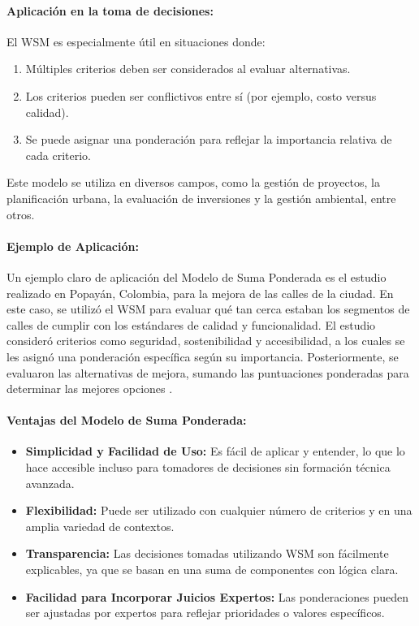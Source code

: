 \documentclass[12pt]{article}
\begin{document}
\paragraph{Aplicación en la toma de decisiones:}
El WSM es especialmente útil en situaciones donde:
\begin{enumerate}
	\item Múltiples criterios deben ser considerados al evaluar alternativas.
	\item Los criterios pueden ser conflictivos entre sí (por ejemplo, costo versus calidad).
	\item Se puede asignar una ponderación para reflejar la importancia relativa de cada criterio.
\end{enumerate}

Este modelo se utiliza en diversos campos, como la gestión de proyectos, la planificación urbana, la evaluación de inversiones y la gestión ambiental, entre otros.

\paragraph{Ejemplo de Aplicación:}
Un ejemplo claro de aplicación del Modelo de Suma Ponderada es el estudio realizado en Popayán, Colombia, para la mejora de las calles de la ciudad. En este caso, se utilizó el WSM para evaluar qué tan cerca estaban los segmentos de calles de cumplir con los estándares de calidad y funcionalidad. El estudio consideró criterios como seguridad, sostenibilidad y accesibilidad, a los cuales se les asignó una ponderación específica según su importancia. Posteriormente, se evaluaron las alternativas de mejora, sumando las puntuaciones ponderadas para determinar las mejores opciones  \cite{Alban2023}.

\paragraph{Ventajas del Modelo de Suma Ponderada:}
\begin{itemize}
	\item \textbf{Simplicidad y Facilidad de Uso:} Es fácil de aplicar y entender, lo que lo hace accesible incluso para tomadores de decisiones sin formación técnica avanzada.
	\item \textbf{Flexibilidad:} Puede ser utilizado con cualquier número de criterios y en una amplia variedad de contextos.
	\item \textbf{Transparencia:} Las decisiones tomadas utilizando WSM son fácilmente explicables, ya que se basan en una suma de componentes con lógica clara.
	\item \textbf{Facilidad para Incorporar Juicios Expertos:} Las ponderaciones pueden ser ajustadas por expertos para reflejar prioridades o valores específicos.
\end{itemize}
\end{document}
